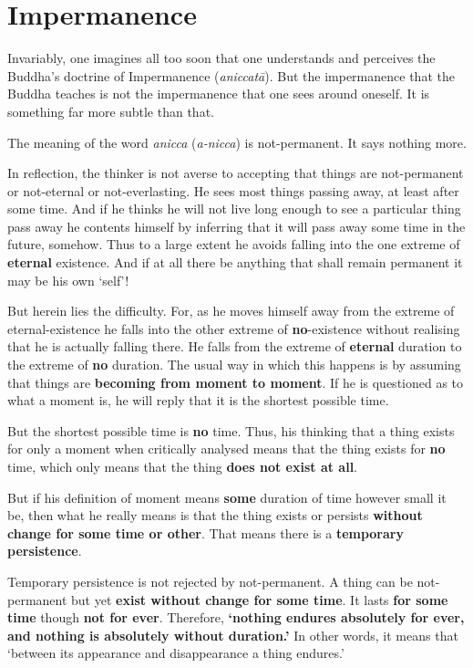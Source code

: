 \chapter{Impermanence}

Invariably, one imagines all too soon that one understands and perceives the Buddha's doctrine of Impermanence (\emph{aniccatā}). But the impermanence that the Buddha teaches is not the impermanence that one sees around oneself. It is something far more subtle than that.

The meaning of the word \emph{anicca} (\emph{a-nicca}) is not-permanent. It says nothing more.

In reflection, the thinker is not averse to accepting that things are not-permanent or not-eternal or not-everlasting. He sees most things passing away, at least after some time. And if he thinks he will not live long enough to see a particular thing pass away he contents himself by inferring that it will pass away some time in the future, somehow. Thus to a large extent he avoids falling into the one extreme of \textbf{eternal} existence. And if at all there be anything that shall remain permanent it may be his own `self'!

But herein lies the difficulty. For, as he moves himself away from the extreme of eternal-existence he falls into the other extreme of \textbf{no}-existence without realising that he is actually falling there. He falls from the extreme of \textbf{eternal} duration to the extreme of \textbf{no} duration. The usual way in which this happens is by assuming that things are \textbf{becoming from moment to moment}. If he is questioned as to what a moment is, he will reply that it is the shortest possible time.

But the shortest possible time is \textbf{no} time. Thus, his thinking that a thing exists for only a moment when critically analysed means that the thing exists for \textbf{no} time, which only means that the thing \textbf{does not exist at all}.

But if his definition of moment means \textbf{some} duration of time however small it be, then what he really means is that the thing exists or persists \textbf{without change for some time or other}. That means there is a \textbf{temporary persistence}.

Temporary persistence is not rejected by not-permanent. A thing can be not-permanent but yet \textbf{exist without change for some time}. It lasts \textbf{for some time} though \textbf{not for ever}. Therefore, \textbf{`nothing endures absolutely for ever, and nothing is absolutely without duration.'} In other words, it means that `between its appearance and disappearance a thing endures.'


